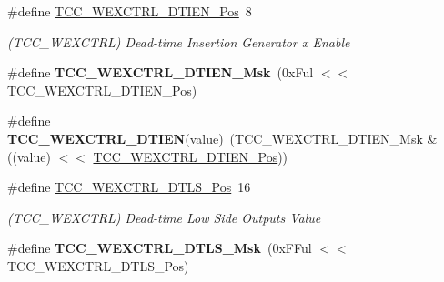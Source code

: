 \begin{DoxyCompactItemize}
\item 
\hypertarget{group___s_a_m_l21___t_c_c_ga9cafe10791d24282d2bcaecde6f07c82}{}\#define \hyperlink{group___s_a_m_l21___t_c_c_ga9cafe10791d24282d2bcaecde6f07c82}{T\+C\+C\+\_\+\+W\+E\+X\+C\+T\+R\+L\+\_\+\+D\+T\+I\+E\+N\+\_\+\+Pos}~8\label{group___s_a_m_l21___t_c_c_ga9cafe10791d24282d2bcaecde6f07c82}

\begin{DoxyCompactList}\small\item\em (T\+C\+C\+\_\+\+W\+E\+X\+C\+T\+R\+L) Dead-\/time Insertion Generator x Enable \end{DoxyCompactList}\item 
\hypertarget{group___s_a_m_l21___t_c_c_ga3a9dde5ad5fbb27db6e43da010f082d6}{}\#define {\bfseries T\+C\+C\+\_\+\+W\+E\+X\+C\+T\+R\+L\+\_\+\+D\+T\+I\+E\+N\+\_\+\+Msk}~(0x\+Ful $<$$<$ T\+C\+C\+\_\+\+W\+E\+X\+C\+T\+R\+L\+\_\+\+D\+T\+I\+E\+N\+\_\+\+Pos)\label{group___s_a_m_l21___t_c_c_ga3a9dde5ad5fbb27db6e43da010f082d6}

\item 
\hypertarget{group___s_a_m_l21___t_c_c_ga7ab123a1fab45810a14b26296e6373b2}{}\#define {\bfseries T\+C\+C\+\_\+\+W\+E\+X\+C\+T\+R\+L\+\_\+\+D\+T\+I\+E\+N}(value)~(T\+C\+C\+\_\+\+W\+E\+X\+C\+T\+R\+L\+\_\+\+D\+T\+I\+E\+N\+\_\+\+Msk \& ((value) $<$$<$ \hyperlink{group___s_a_m_l21___t_c_c_ga9cafe10791d24282d2bcaecde6f07c82}{T\+C\+C\+\_\+\+W\+E\+X\+C\+T\+R\+L\+\_\+\+D\+T\+I\+E\+N\+\_\+\+Pos}))\label{group___s_a_m_l21___t_c_c_ga7ab123a1fab45810a14b26296e6373b2}

\item 
\hypertarget{group___s_a_m_l21___t_c_c_ga7a2f2a028e8575f02a20cee3184b1ddf}{}\#define \hyperlink{group___s_a_m_l21___t_c_c_ga7a2f2a028e8575f02a20cee3184b1ddf}{T\+C\+C\+\_\+\+W\+E\+X\+C\+T\+R\+L\+\_\+\+D\+T\+L\+S\+\_\+\+Pos}~16\label{group___s_a_m_l21___t_c_c_ga7a2f2a028e8575f02a20cee3184b1ddf}

\begin{DoxyCompactList}\small\item\em (T\+C\+C\+\_\+\+W\+E\+X\+C\+T\+R\+L) Dead-\/time Low Side Outputs Value \end{DoxyCompactList}\item 
\hypertarget{group___s_a_m_l21___t_c_c_ga6a59b970491f72af526aba362bd5364c}{}\#define {\bfseries T\+C\+C\+\_\+\+W\+E\+X\+C\+T\+R\+L\+\_\+\+D\+T\+L\+S\+\_\+\+Msk}~(0x\+F\+Ful $<$$<$ T\+C\+C\+\_\+\+W\+E\+X\+C\+T\+R\+L\+\_\+\+D\+T\+L\+S\+\_\+\+Pos)\label{group___s_a_m_l21___t_c_c_ga6a59b970491f72af526aba362bd5364c}


\end{DoxyCompactItemize}
